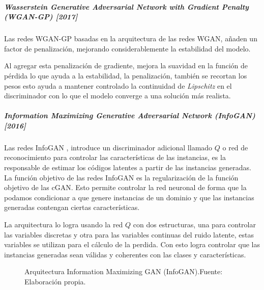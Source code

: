 
\subparagraph{Wasserstein Generative Adversarial Network with Gradient Penalty (WGAN-GP) [2017]}

Las redes \gls{WGAN-GP} \cite{WGAN-GP-gulrajani2017improved} basadas en la arquitectura de las redes \gls{WGAN}, añaden un factor de penalización, mejorando considerablemente la estabilidad del modelo.

Al agregar esta penalización de gradiente, mejora la suavidad en la función de pérdida lo que ayuda a la estabilidad, la penalización, también se recortan los pesos esto ayuda a mantener controlado la continuidad de \textit{Lipschitz} en el discriminador con lo que el modelo converge a una solución más realista.





\subparagraph{Information Maximizing Generative Adversarial Network (InfoGAN) [2016]}

Las redes \gls{InfoGAN} \cite{InfoGAN-chen2016infogan}, introduce un discriminador adicional llamado ${Q}$ o red de reconocimiento para controlar las características de las instancias, es la  responsable de estimar los códigos latentes a partir de las instancias generadas. La función objetivo de las redes \gls{InfoGAN} es la regularización de la función objetivo de las \gls{cGAN}. Esto permite controlar la red neuronal de forma que la podamos condicionar a que genere instancias de un dominio y que las instancias generadas contengan ciertas características.

La arquitectura lo logra usando la red ${Q}$ con dos estructuras, una para controlar las variables discretas y otra para las variables continuas del ruido latente, estas variables se utilizan para el cálculo de la perdida. Con esto logra controlar que las instancias generadas sean válidas y coherentes con las clases y características.

\begin{figure}[H]
    \centering
    \centerline{}
    \caption{Arquitectura Information Maximizing GAN (InfoGAN).\newline{}Fuente: Elaboración propia.}
    \label{fig:InfoGAN}
\end{figure}

